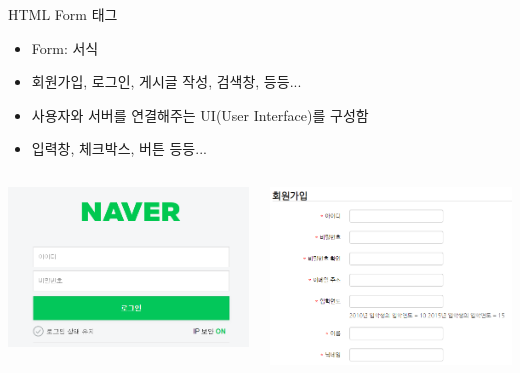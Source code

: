 \documentclass{beamer}
\begin{document}
    \begin{frame}{HTML Form 태그}
        \begin{itemize}
            \item Form: 서식
            \item 회원가입, 로그인, 게시글 작성, 검색창, 등등...
            \item 사용자와 서버를 연결해주는 UI(User Interface)를 구성함
            \item 입력창, 체크박스, 버튼 등등...
        \end{itemize}
        \vspace{0.5cm}
        \begin{columns}
            \begin{column}{0.3\textwidth}
                \includegraphics[width=\linewidth]{Images/naver_login.png}
            \end{column}
            \begin{column}{0.3\textwidth}
                \includegraphics[width=\linewidth]{Images/argos_join.png}

\end{column}
\end{columns}
\end{frame}
\end{document}
